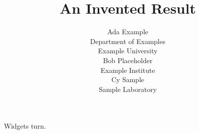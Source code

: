 \documentclass{article}
\title{An Invented Result}
\author{Ada Example \\ Department of Examples \\ Example University \\
  \And
  Bob Placeholder \\ Example Institute \\
  \AND
  Cy Sample \\ Sample Laboratory}
\begin{document}
\maketitle
Widgets turn.
\end{document}
